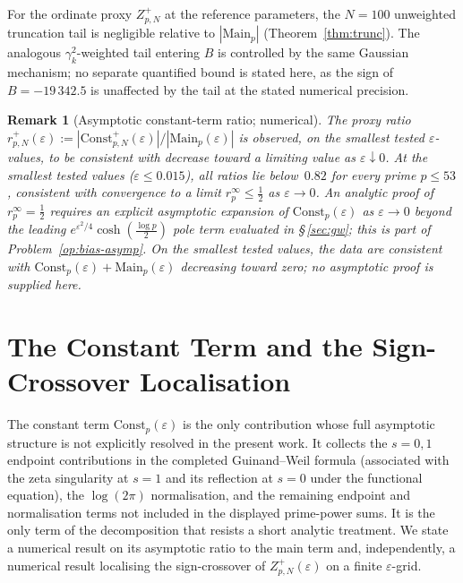 \documentclass[11pt]{article}
\newtheorem*{remark}{Remark}
\begin{document}
For the ordinate proxy $Z_{p,N}^+$ at the reference parameters,
the $N=100$ unweighted truncation tail is negligible relative to
$|\mathrm{Main}_p|$ (Theorem~\ref{thm:trunc}).
The analogous $\gamma_k^2$-weighted tail entering $B$ is
controlled by the same Gaussian mechanism; no separate quantified
bound is stated here, as the sign of $B=-19\,342.5$ is unaffected
by the tail at the stated numerical precision.

\begin{remark}[Asymptotic constant-term ratio; numerical]
\label{rem:rpinf}
The proxy ratio $r^+_{p,N}(\varepsilon):=
|\mathrm{Const}^+_{p,N}(\varepsilon)|/|\mathrm{Main}_p(\varepsilon)|$
is observed, on the smallest tested $\varepsilon$-values, to be
consistent with decrease toward a limiting value as $\varepsilon\downarrow 0$.
At the smallest tested values ($\varepsilon\le 0.015$), all ratios
lie below~$0.82$ for every prime $p\le 53$, consistent with convergence
to a limit $r_p^{\infty}\le\tfrac12$ as $\varepsilon\to 0$.
An analytic proof of $r_p^{\infty}=\tfrac12$ requires an explicit
asymptotic expansion of $\mathrm{Const}_p(\varepsilon)$ as $\varepsilon\to 0$
beyond the leading $e^{\varepsilon^2/4}\cosh(\tfrac{\log p}{2})$ pole term
evaluated in \S\,\ref{sec:gw}; this is part of Problem~\ref{op:bias-asymp}.
On the smallest tested values, the data are consistent with
$\mathrm{Const}_p(\varepsilon)+\mathrm{Main}_p(\varepsilon)$ decreasing
toward zero; no asymptotic proof is supplied here.
\end{remark}

\section{The Constant Term and the Sign-Crossover Localisation}
\label{sec:const}

The constant term $\mathrm{Const}_p(\varepsilon)$ is the only contribution
whose full asymptotic structure is not explicitly resolved in the present work.
It collects the
$s=0,1$ endpoint contributions in the completed Guinand--Weil formula
(associated with the zeta singularity at $s=1$ and its reflection
at $s=0$ under the functional equation), the $\log(2\pi)$ normalisation,
and the remaining endpoint and normalisation terms not included in
the displayed prime-power sums.
It is the only term of the decomposition that resists a short analytic
treatment.
We state a numerical result on its asymptotic ratio to the main term
and, independently, a numerical result localising the sign-crossover
of $Z_{p,N}^+(\varepsilon)$ on a finite $\varepsilon$-grid.
\end{document}
